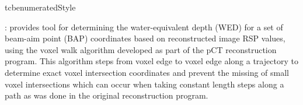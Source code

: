 \begin{tcbenvironment}
\begin{tcbparbox}{tcbenumeratedStyle}
\begin{ThinEnum}[parsep=\currentparsep]
\begin{ThinEnum}[parsep=\currentparsep]
        \item {} : provides tool for determining the water-equivalent depth (WED) for a set of beam-aim point (BAP) coordinates based on reconstructed image RSP values, using the voxel walk algorithm developed as part of the pCT reconstruction program.  This algorithm steps from voxel edge to voxel edge along a trajectory to determine exact voxel intersection coordinates and prevent the missing of small voxel intersections which can occur when taking constant length steps along a path as was done in the original reconstruction program.
    \end{ThinEnum}
\end{ThinEnum}
\end{tcbparbox}
\end{tcbenvironment}
\endinput

